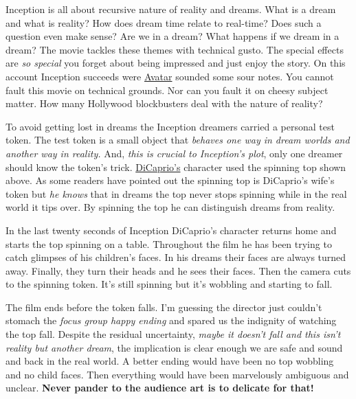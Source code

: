 Inception is all about recursive nature of reality and dreams. What is a
dream and what is reality? How does dream time relate to real-time? Does
such a question even make sense? Are we in a dream? What happens if we
dream in a dream? The movie tackles these themes with technical gusto.
The special effects are \emph{so special} you forget about being
impressed and just enjoy the story. On this account Inception succeeds
were \href{http://www.avatarmovie.com/}{Avatar} sounded some sour notes.
You cannot fault this movie on technical grounds. Nor can you fault it
on cheesy subject matter. How many Hollywood blockbusters deal with the
nature of reality?

To avoid getting lost in dreams the Inception dreamers carried a
personal test token. The test token is a small object that \emph{behaves
one way in dream worlds and another way in reality.} And, \emph{this is
crucial to Inception's plot}, only one dreamer should know the token's
trick.
\href{http://en.wikipedia.org/wiki/Leonardo\_DiCaprio}{DiCaprio's}
character used the spinning top shown above. As some readers have
pointed out the spinning top is DiCaprio's wife's token but \emph{he
knows} that in dreams the top never stops spinning while in the real
world it tips over. By spinning the top he can distinguish dreams from
reality.

In the last twenty seconds of Inception DiCaprio's character returns
home and starts the top spinning on a table. Throughout the film he has
been trying to catch glimpses of his children's faces. In his dreams
their faces are always turned away. Finally, they turn their heads and
he sees their faces. Then the camera cuts to the spinning token. It's
still spinning but it's wobbling and starting to fall.

The film ends before the token falls. I'm guessing the director just
couldn't stomach the \emph{focus group happy ending} and spared us the
indignity of watching the top fall. Despite the residual uncertainty,
\emph{maybe it doesn't fall and this isn't reality but another dream},
the implication is clear enough we are safe and sound and back in the
real world. A better ending would have been no top wobbling and no child
faces. Then everything would have been marvelously ambiguous and
unclear. \textbf{Never pander to the audience art is to delicate for
that!}





%